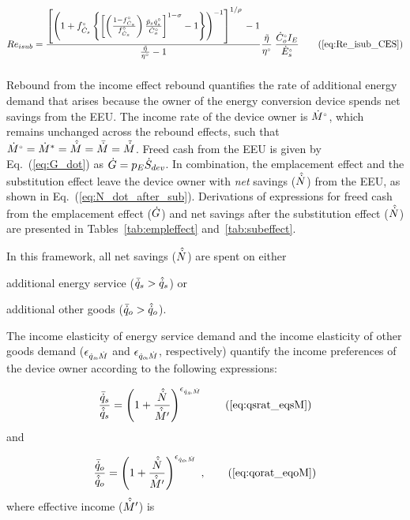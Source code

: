 \begin{equation}
  Re_{isub} = \ReisubCES{} \tag{\ref{eq:Re_isub_CES}}
\end{equation}


\subsubsection{\Inceffect{}} 
\label{sec:Re_inc}

Rebound from the income effect rebound quantifies the rate of additional energy demand 
that arises because the owner of the energy conversion device spends net
savings from the EEU.
The income rate of the device owner is ${}{\dot{M}}^{\scriptscriptstyle \circ}$, 
which remains unchanged across the rebound effects, 
such that
${}{\dot{M}}^{\scriptscriptstyle \circ} = {\dot{M}}^* = \hat{\dot{M}} = \bar{\dot{M}} = \tilde{\dot{M}}$.
Freed cash from the EEU is given by Eq.~(\ref{eq:G_dot})
as $\dot{G} = p_E \dot{S}_{dev}$. 
In combination, the emplacement effect and
the substitution effect leave the device owner with
\emph{net} savings ($\hat{\dot{N}}$) from the EEU,
as shown in Eq.~(\ref{eq:N_dot_after_sub}).
Derivations of expressions for 
freed cash from the emplacement effect ($\dot{G}$) and
net savings after the substitution effect ($\hat{\dot{N}}$)
are presented in Tables~\ref{tab:empleffect} and~\ref{tab:subeffect}.

In this framework, all net savings ($\hat{\dot{N}}$) are spent on either 
%
\begin{enumerate*}[label={(\roman*)}]
	
  \item additional energy service ($\bar{\dot{q}}_s > \hat{\dot{q}}_s$) or
  
  \item additional other goods ($\bar{\dot{q}}_o > \hat{\dot{q}}_o$).
    
\end{enumerate*}
%
The income elasticity of energy service demand and 
the income elasticity of other goods demand 
($\epsilon_{\dot{q}_s\!,\dot{M}}$ and $\epsilon_{\dot{q}_o\!,\dot{M}}$, respectively)
quantify the income preferences of the device owner according to the following expressions:

\begin{equation}
  \incprefseqn \tag{\ref{eq:qsrat_eqsM}}
\end{equation}
%
and

\begin{equation}
  \incprefoeqn \; , \tag{\ref{eq:qorat_eqoM}}
\end{equation}
%
where effective income ($\hat{\dot{M}}^\prime$) is

